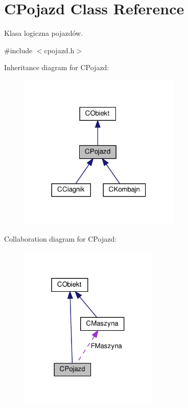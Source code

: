 \hypertarget{class_c_pojazd}{}\section{C\+Pojazd Class Reference}
\label{class_c_pojazd}


Klasa logiczna pojazdów.  




{\ttfamily \#include $<$cpojazd.\+h$>$}



Inheritance diagram for C\+Pojazd\+:\nopagebreak
\begin{figure}[H]
\begin{center}
\leavevmode
\includegraphics[width=218pt]{class_c_pojazd__inherit__graph}
\end{center}
\end{figure}


Collaboration diagram for C\+Pojazd\+:\nopagebreak
\begin{figure}[H]
\begin{center}
\leavevmode
\includegraphics[width=187pt]{class_c_pojazd__coll__graph}
\end{center}
\end{figure}
